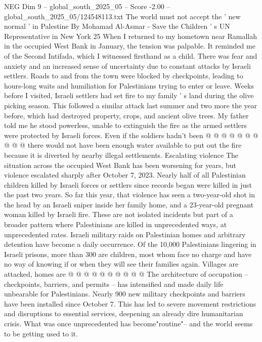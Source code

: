 \begin{textsample}{NEG Dim 9 – global\_south\_2025\_05 – Score -2.00 – global\_south\_2025\_05/124548113.txt}  \label{ex:f9_neg_255}
The world must not accept the ' new normal ' in Palestine By Mohamad Al-Asmar - Save the Children ' s UN Representative in New York 25 When I returned to my hometown near Ramallah in the occupied West Bank in January, the tension was palpable.
It reminded me of the Second Intifada, which I witnessed firsthand as a child.
There was fear and anxiety and an increased sense of uncertainty due to constant attacks by Israeli settlers.
Roads to and from the town were blocked by checkpoints, leading to hours-long waits and humiliation for Palestinians trying to enter or leave.
Weeks before I visited, Israeli settlers had set fire to my family ' s land during the olive picking season.
This followed a similar attack last summer and two more the year before, which had destroyed property, crops, and ancient olive trees.
My father told me he stood powerless, unable to extinguish the fire as the armed settlers were protected by Israeli forces.
Even if the soldiers hadn't been @ @ @ @ @ @ @ @ @ @ there would not have been enough water available to put out the fire because it is diverted by nearby illegal settlements.
Escalating violence The situation across the occupied West Bank has been worsening for years, but violence escalated sharply after October 7, 2023.
Nearly half of all Palestinian children killed by Israeli forces or settlers since records began were killed in just the past two years.
So far this year, that violence has seen a two-year-old shot in the head by an Israeli sniper inside her family home, and a 23-year-old pregnant woman killed by Israeli fire.
These are not isolated incidents but part of a broader pattern where Palestinians are killed in unprecedented ways, at unprecedented rates.
Israeli military raids on Palestinian homes and arbitrary detention have become a daily occurrence.
Of the 10,000 Palestinians lingering in Israeli prisons, more than 300 are children, most whom face no charge and have no way of knowing if or when they will see their families again.
Villages are attacked, homes are @ @ @ @ @ @ @ @ @ @ The architecture of occupation -- checkpoints, barriers, and permits -- has intensified and made daily life unbearable for Palestinians.
Nearly 900 new military checkpoints and barriers have been installed since October 7.
This has led to severe movement restrictions and disruptions to essential services, deepening an already dire humanitarian crisis.
What was once unprecedented has become"routine"-- and the world seems to be getting used to it.

\end{textsample}
